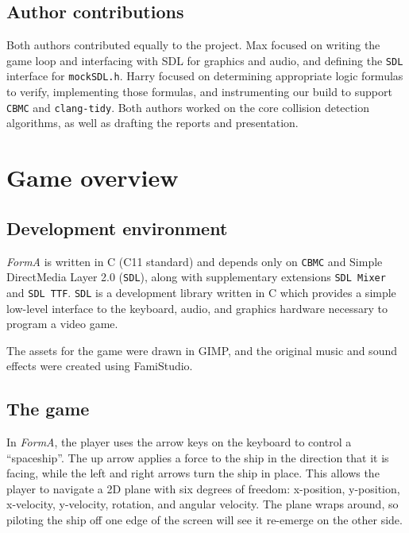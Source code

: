\documentclass{article}
\newcommand{\Name}{\textit{FormA}\xspace}
\newcommand{\cbmc}{\texttt{CBMC}}
\newcommand{\sdl}{\texttt{SDL}}
\begin{document}
    \subsection{Author contributions}

        Both authors contributed equally to the project. Max focused
        on writing the game loop and interfacing with SDL for graphics and
        audio, and defining the \sdl{} interface for \texttt{mockSDL.h}. Harry
        focused on determining appropriate logic formulas to verify,
        implementing those formulas, and instrumenting our build to support
        \cbmc{} and \texttt{clang-tidy}. Both authors worked on the core
        collision detection algorithms, as well as drafting the reports and
        presentation.

\section{Game overview}

    \subsection{Development environment}

        \Name{} is written in C (C11 standard) and depends only on \cbmc{} and
        Simple DirectMedia Layer 2.0 (\sdl{}), along with supplementary
        extensions \texttt{SDL Mixer} and \texttt{SDL TTF}. \sdl{} is a
        development library written in C which provides a simple low-level
        interface to the keyboard, audio, and graphics hardware necessary to
        program a video game.

        The assets for the game were drawn in GIMP, and the original music and
        sound effects were created using FamiStudio.

    \subsection{The game}

        In \Name{}, the player uses the arrow keys on the keyboard to
        control a ``spaceship''. The up arrow applies a force to the ship in the
        direction that it is facing, while the left and right arrows turn the
        ship in place. This allows the player to navigate a 2D plane with six
        degrees of freedom: x-position, y-position, x-velocity, y-velocity,
        rotation, and angular velocity. The plane wraps around, so piloting the
        ship off one edge of the screen will see it re-emerge on the other side.
\end{document}
